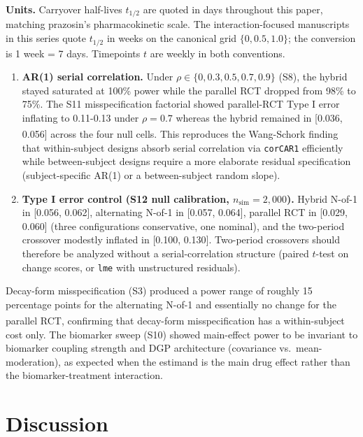 \documentclass[
  11pt,
]{article}
\begin{document}
\textbf{Units.} Carryover half-lives \(t_{1/2}\) are quoted in days
throughout this paper, matching prazosin's pharmacokinetic scale.
The interaction-focused manuscripts in this series quote \(t_{1/2}\)
in weeks on the canonical grid \(\{0, 0.5, 1.0\}\); the conversion is
1 week = 7 days. Timepoints \(t\) are weekly in both conventions.

\begin{enumerate}
\def\labelenumi{\arabic{enumi}.}
\setcounter{enumi}{3}
\item
  \textbf{AR(1) serial correlation.} Under
  \(\rho \in \{0, 0.3, 0.5, 0.7, 0.9\}\) (S8), the hybrid stayed
  saturated at 100\% power while the parallel RCT dropped from
  98\% to 75\%. The S11 misspecification factorial showed
  parallel-RCT Type I error inflating to 0.11-0.13 under
  \(\rho = 0.7\) whereas the hybrid remained in {[}0.036, 0.056{]}
  across the four null cells. This reproduces the
  Wang-Schork\textsuperscript{} finding that
  within-subject designs absorb serial correlation via
  \texttt{corCAR1} efficiently while between-subject designs require
  a more elaborate residual specification (subject-specific
  AR(1) or a between-subject random slope).
\item
  \textbf{Type I error control (S12 null calibration,
  \(n_{\text{sim}} = 2{,}000\)).} Hybrid N-of-1 in {[}0.056, 0.062{]},
  alternating N-of-1 in {[}0.057, 0.064{]}, parallel RCT in
  {[}0.029, 0.060{]} (three configurations conservative, one
  nominal), and the two-period crossover modestly inflated in
  {[}0.100, 0.130{]}. Two-period crossovers should therefore be
  analyzed without a serial-correlation structure (paired
  \(t\)-test on change scores, or \texttt{lme} with unstructured
  residuals).
\end{enumerate}

Decay-form misspecification (S3) produced a power range of
roughly 15 percentage points for the alternating N-of-1 and
essentially no change for the parallel RCT\textsuperscript{}, confirming that decay-form
misspecification has a within-subject cost only. The biomarker
sweep (S10) showed main-effect power to be invariant to
biomarker coupling strength and DGP architecture (covariance
vs.~mean-moderation), as expected when the estimand is the main
drug effect rather than the biomarker-treatment interaction.

\section{Discussion}\label{discussion}
\end{document}
